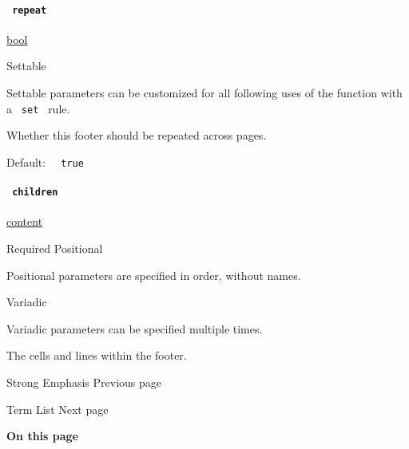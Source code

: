 \paragraph{\texorpdfstring{\texttt{\ repeat\ }}{ repeat }}\label{definitions-footer-repeat}

\href{/docs/reference/foundations/bool/}{bool}

{{ Settable }}

\label{definitions-footer-repeat-settable-tooltip}
Settable parameters can be customized for all following uses of the
function with a \texttt{\ set\ } rule.

Whether this footer should be repeated across pages.

Default: \texttt{\ }{\texttt{\ true\ }}\texttt{\ }

\paragraph{\texorpdfstring{\texttt{\ children\ }}{ children }}\label{definitions-footer-children}

\href{/docs/reference/foundations/content/}{content}

{Required} {{ Positional }}

\label{definitions-footer-children-positional-tooltip}
Positional parameters are specified in order, without names.

{{ Variadic }}

\label{definitions-footer-children-variadic-tooltip}
Variadic parameters can be specified multiple times.

The cells and lines within the footer.

\href{/docs/reference/model/strong/}{\pandocbounded{}}

{ Strong Emphasis } { Previous page }

\href{/docs/reference/model/terms/}{\pandocbounded{}}

{ Term List } { Next page }

\textbf{On this page}

